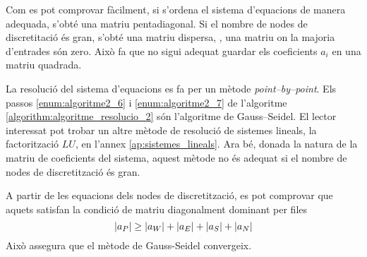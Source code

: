 Com es pot comprovar fàcilment, si s'ordena el sistema d'equacions de manera adequada, s'obté una matriu pentadiagonal. Si el nombre de nodes de discretitació és gran, s'obté una matriu dispersa, \ie, una matriu on la majoria d'entrades són zero. Això fa que no sigui adequat guardar els coeficients $a_i$ en una matriu quadrada. 

La resolució del sistema d'equacions es fa per un mètode \emph{point--by--point}. Els passos \ref{enum:algoritme2_6} i \ref{enum:algoritme2_7} de l'algoritme \ref{algorithm:algoritme_resolucio_2} són l'algoritme de Gauss--Seidel. El lector interessat pot trobar un altre mètode de resolució de sistemes lineals, la factorització $L U$, en l'annex \ref{ap:sistemes_lineals}. Ara bé, donada la natura de la matriu de coeficients del sistema, aquest mètode no és adequat si el nombre de nodes de discretització és gran. 

A partir de les equacions dels nodes de discretització, es pot comprovar que aquets satisfan la condició de matriu diagonalment dominant per files
\begin{equation}
	\abs{a_P} \geq \abs{a_W} + \abs{a_E} + \abs{a_S} + \abs{a_N}
\end{equation}
Això assegura que el mètode de Gauss-Seidel convergeix.



